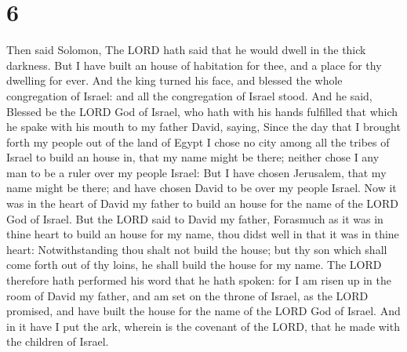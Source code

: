 \hypertarget{section-5}{%
\section{6}\label{section-5}}

 Then said Solomon, The LORD hath said that he would dwell
in the thick darkness.  But I have built an house of
habitation for thee, and a place for thy dwelling for ever.
 And the king turned his face, and blessed the whole
congregation of Israel: and all the congregation of Israel stood.
 And he said, Blessed be the LORD God of Israel, who hath
with his hands fulfilled that which he spake with his mouth to my father
David, saying,  Since the day that I brought forth my
people out of the land of Egypt I chose no city among all the tribes of
Israel to build an house in, that my name might be there; neither chose
I any man to be a ruler over my people Israel:  But I have
chosen Jerusalem, that my name might be there; and have chosen David to
be over my people Israel.  Now it was in the heart of
David my father to build an house for the name of the LORD God of
Israel.  But the LORD said to David my father, Forasmuch
as it was in thine heart to build an house for my name, thou didst well
in that it was in thine heart:  Notwithstanding thou shalt
not build the house; but thy son which shall come forth out of thy
loins, he shall build the house for my name.  The LORD
therefore hath performed his word that he hath spoken: for I am risen up
in the room of David my father, and am set on the throne of Israel, as
the LORD promised, and have built the house for the name of the LORD God
of Israel.  And in it have I put the ark, wherein is the
covenant of the LORD, that he made with the children of Israel.

